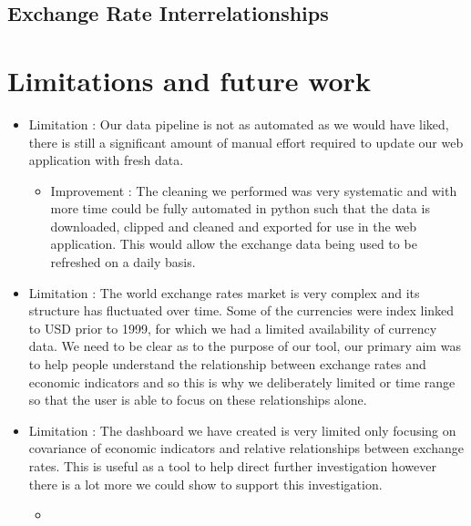 \subsection{Exchange Rate Interrelationships}

\section{Limitations and future work}

\begin{itemize}
	\item Limitation : Our data pipeline is not as automated as we would have liked, there is still a significant amount of manual effort required to update our web application with fresh data.
	\begin{itemize}
		\item Improvement : The cleaning we performed was very systematic and with more time could be fully automated in python such that the data is downloaded, clipped and cleaned and exported for use in the web application.  This would allow the exchange data being used to be refreshed on a daily basis.
	\end{itemize} 
	\item Limitation : The world exchange rates market is very complex and its structure has fluctuated over time. Some of the currencies were index linked to USD prior to 1999, for which we had a limited availability of currency data.  We need to be clear as to the purpose of our tool, our primary aim was to help people understand the relationship between exchange rates and economic indicators and so this is why we deliberately limited or time range so that the user is able to focus on these relationships alone.
	\item Limitation : The dashboard we have created is very limited only focusing on covariance of economic indicators and relative relationships between exchange rates.  This is useful as a tool to help direct further investigation however there is a lot more we could show to support this investigation.
	\begin{itemize}
		\item 
	\end{itemize}
\end{itemize}



 







